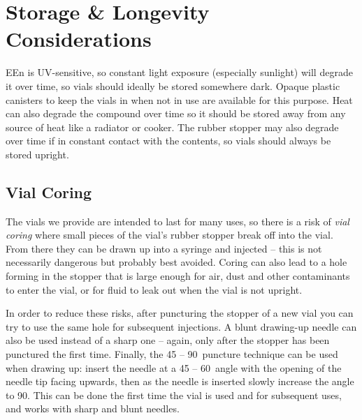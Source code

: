 \documentclass[twoside,a5paper]{article}
\begin{document}
\section{Storage \& Longevity Considerations}

EEn is UV-sensitive, so constant light exposure (especially sunlight)
will degrade it over time, so vials should ideally be stored somewhere
dark.  Opaque plastic canisters to keep the vials in when not in use
are available for this purpose.  Heat can also degrade the compound
over time so it should be stored away from any source of heat like a
radiator or cooker.  The rubber stopper may also degrade over time if
in constant contact with the contents, so vials should always be
stored upright.

\subsection{Vial Coring}

The vials we provide are intended to last for many uses, so there is a
risk of \textit{vial coring} where small pieces of the vial's rubber
stopper break off into the vial.  From there they can be drawn up into
a syringe and injected -- this is not necessarily dangerous but
probably best avoided.  Coring can also lead to a hole forming in the
stopper that is large enough for air, dust and other contaminants to
enter the vial, or for fluid to leak out when the vial is not upright.

In order to reduce these risks, after puncturing the stopper of a new
vial you can try to use the same hole for subsequent injections.  A
blunt drawing-up needle can also be used instead of a sharp one --
again, only after the stopper has been punctured the first time.
Finally, the 45 -- 90\textdegree\ puncture technique can be used when
drawing up: insert the needle at a 45 -- 60\textdegree\ angle with the
opening of the needle tip facing upwards, then as the needle is
inserted slowly increase the angle to 90\textdegree.  This can be done
the first time the vial is used and for subsequent uses, and works
with sharp and blunt needles.

\clearpage
\hfill
\clearpage
\end{document}

